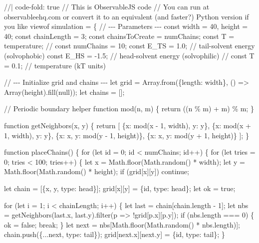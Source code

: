 \documentclass[
  letterpaper,
  enabledeprecatedfontcommands]{report}
\newenvironment{Shaded}{\begin{snugshade}}{\end{snugshade}}
\newcommand{\NormalTok}[1]{\textcolor[rgb]{0.00,0.23,0.31}{#1}}
\begin{document}
\begin{Shaded}
\begin{Highlighting}[]
\NormalTok{//| code{-}fold: true}
\NormalTok{// This is ObservableJS code  }
\NormalTok{// You can run at observableehq.com or convert it to an equivalent (and faster?) Python version if you like}
\NormalTok{viewof simulation = \{}
\NormalTok{    // {-}{-}{-} Parameters {-}{-}{-}}
\NormalTok{    const width = 40, height = 40;}
\NormalTok{    const chainLength = 3;}
\NormalTok{    const chainsToCreate = numChains;}
\NormalTok{    const T = temperature;}
\NormalTok{    // const numChains = 10;}
\NormalTok{    const E\_TS = 1.0;     // tail{-}solvent energy (solvophobic)}
\NormalTok{    const E\_HS = {-}1.5;    // head{-}solvent energy (solvophilic)}
\NormalTok{    // const T = 0.1;        // temperature (kT units)}

\NormalTok{    // {-}{-}{-} Initialize grid and chains {-}{-}{-}}
\NormalTok{    let grid = Array.from(\{length: width\}, () =\textgreater{} Array(height).fill(null));}
\NormalTok{    let chains = [];}

\NormalTok{    // Periodic boundary helper}
\NormalTok{    function mod(n, m) \{ return ((n \% m) + m) \% m; \}}

\NormalTok{    function getNeighbors(x, y) \{}
\NormalTok{        return [}
\NormalTok{            \{x: mod(x {-} 1, width), y: y\},}
\NormalTok{            \{x: mod(x + 1, width), y: y\},}
\NormalTok{            \{x: x, y: mod(y {-} 1, height)\},}
\NormalTok{            \{x: x, y: mod(y + 1, height)\}}
\NormalTok{        ];}
\NormalTok{    \}}

\NormalTok{    function placeChains() \{}
\NormalTok{        for (let id = 0; id \textless{} numChains; id++) \{}
\NormalTok{            for (let tries = 0; tries \textless{} 100; tries++) \{}
\NormalTok{                let x = Math.floor(Math.random() * width);}
\NormalTok{                let y = Math.floor(Math.random() * height);}
\NormalTok{                if (grid[x][y]) continue;}

\NormalTok{                let chain = [\{x, y, type: \textquotesingle{}head\textquotesingle{}\}];}
\NormalTok{                grid[x][y] = \{id, type: \textquotesingle{}head\textquotesingle{}\};}
\NormalTok{                let ok = true;}

\NormalTok{                for (let i = 1; i \textless{} chainLength; i++) \{}
\NormalTok{                    let last = chain[chain.length {-} 1];}
\NormalTok{                    let nbs = getNeighbors(last.x, last.y).filter(p =\textgreater{} !grid[p.x][p.y]);}
\NormalTok{                    if (nbs.length === 0) \{ ok = false; break; \}}
\NormalTok{                    let next = nbs[Math.floor(Math.random() * nbs.length)];}
\NormalTok{                    chain.push(\{...next, type: \textquotesingle{}tail\textquotesingle{}\});}
\NormalTok{                    grid[next.x][next.y] = \{id, type: \textquotesingle{}tail\textquotesingle{}\};}
\NormalTok{                \}}


\end{Highlighting}
\end{Shaded}
\end{document}
